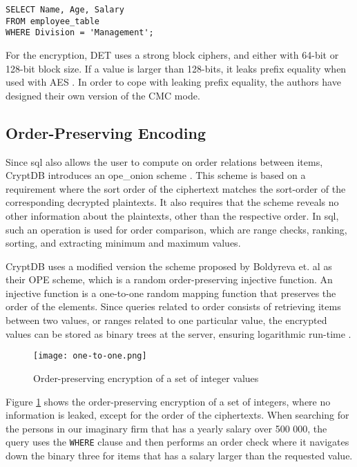 \begin{verbatim}
SELECT Name, Age, Salary
FROM employee_table
WHERE Division = 'Management';
\end{verbatim}

For the encryption, DET uses a strong block ciphers, and either with 64-bit or 128-bit block size. If a value is larger than 128-bits, it leaks  prefix equality when used with AES \citep{CryptDB_Main_Paper}. In order to cope with leaking prefix equality, the authors have designed their own version of the CMC mode.



\subsection{Order-Preserving Encoding}
\label{sec:ope}

Since \Gls{sql} also allows the user to compute on order relations between items, CryptDB introduces an \Gls{ope_onion} scheme \citep{CryptDB_Main_Paper}. This scheme is based on a requirement where the sort order of the ciphertext matches the sort-order of the corresponding decrypted plaintexts. It also requires that the scheme reveals no other information about the plaintexts, other than the respective order. In \Gls{sql}, such an operation is used for order comparison, which are range checks, ranking, sorting, and extracting minimum and maximum values. 

CryptDB uses a modified version the scheme proposed by Boldyreva et. al \citep{ope_cryptdb} as their OPE scheme, which is a random order-preserving injective function. An injective function is a one-to-one random mapping function that preserves the order of the elements. Since queries related to order consists of retrieving items between two values, or ranges related to one particular value, the encrypted values can be stored as binary trees at the server, ensuring logarithmic run-time \cite{ope_cryptdb}.

\begin{figure}[h]
	\texttt{[image: one-to-one.png]}
	\caption{Order-preserving encryption of a set of integer values}
	\label{fig:ope_function}
\end{figure}

Figure \ref{fig:ope_function} shows the order-preserving encryption of a set of integers, where no information is leaked, except for the order of the ciphertexts. When searching for the persons in our imaginary firm that has a yearly salary over 500 000, the query uses the \verb!WHERE! clause and then performs an order check where it navigates down the binary three for items that has a salary larger than the requested value.

